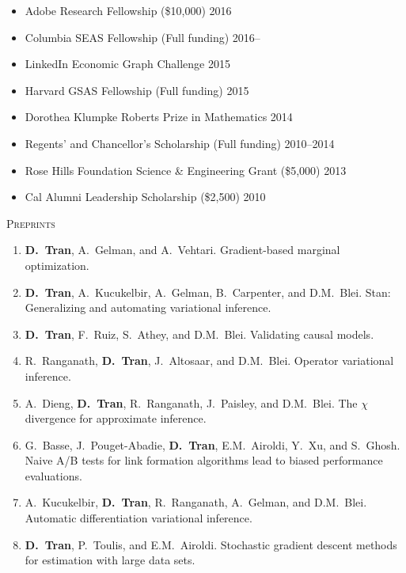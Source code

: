 \documentclass[11pt]{article}
\renewcommand{\section}[1]
{\vspace{1.0\baselineskip}{\Large\textbf{#1}}}
\begin{document}
\begin{itemize}[leftmargin=12pt]
  \item[] Adobe Research Fellowship (\$10,000)
  \hfill 2016
  \item[] Columbia SEAS Fellowship (Full funding)
  \hfill 2016--
  \item[] LinkedIn Economic Graph Challenge
  \hfill 2015
  \item[] Harvard GSAS Fellowship (Full funding)
  \hfill 2015
  \item[] Dorothea Klumpke Roberts Prize in Mathematics
  \hfill 2014
  \item[] Regents' and Chancellor's Scholarship (Full funding)
  \hfill 2010--2014
  \item[] Rose Hills Foundation Science \& Engineering Grant (\$5,000)
  \hfill 2013
  \item[] Cal Alumni Leadership Scholarship (\$2,500)
  \hfill 2010
\end{itemize}

\section{Publications}

\textsc{Preprints}
\begin{enumerate}
  \item
  \textbf{D.~Tran}, A.~Gelman, and A.~Vehtari.
  Gradient-based marginal optimization.
  \item
  \textbf{D.~Tran}, A.~Kucukelbir, A.~Gelman, B.~Carpenter, and D.M.~Blei.
  Stan: Generalizing and automating variational inference.
  \item
  \textbf{D.~Tran}, F.~Ruiz, S.~Athey, and D.M.~Blei.
  Validating causal models.
  \item
  R.~Ranganath, \textbf{D.~Tran}, J.~Altosaar, and D.M.~Blei.
  Operator variational inference.
  \item
  A.~Dieng, \textbf{D.~Tran}, R.~Ranganath, J.~Paisley, and D.M.~Blei.
  The $\chi$ divergence for approximate inference.
  \item
  G.~Basse, J.~Pouget-Abadie, \textbf{D.~Tran}, E.M.~Airoldi, Y.~Xu, and
  S.~Ghosh.
  Naive A/B tests for link formation algorithms lead to biased
  performance evaluations.
  \item
  A.~Kucukelbir, \textbf{D.~Tran}, R.~Ranganath, A.~Gelman, and D.M.~Blei.
  Automatic differentiation variational inference.
  \item
  \textbf{D.~Tran}, P.~Toulis, and E.M.~Airoldi.
  Stochastic gradient descent methods for estimation with large data sets.
\end{enumerate}
\end{document}
